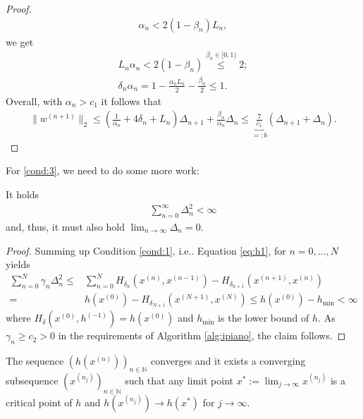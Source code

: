 \documentclass[onecolumn,final,a4paper,13pt,reqno]{siamart}
\makeatletter
\DeclareRobustCommand\onedot{\futurelet\@let@token\@onedot}
\def\@onedot{\ifx\@let@token.\else.\null\fi\xspace}
\def\ie{{i.e}\onedot} \def\Ie{{I.e}\onedot}
\makeatother
\begin{document}
\begin{proof}
	\begin{align}
		\alpha_n < {2(1 - \beta_n)}{L_n},
	\end{align}
	we get
	\begin{align}
		L_n\alpha_n < 2(1 - \beta_n) \overset{\beta_n \in [0,1)}{\leq} 2;\\
		\delta_n \alpha_n = 1 - \frac{\alpha_n L_n}{2} - \frac{\beta_n}{2} \leq 1.
	\end{align}
	Overall, with $\alpha_n > c_1$ it follows that
	\begin{align}
		\|w^{(n + 1)}\|_2 \leq \left(\frac{1}{\alpha_n} + 4\delta_n + L_n\right)\Delta_{n + 1} + \frac{\beta_n}{\alpha_n}\Delta_n \leq \underbrace{\frac{7}{c_1}}_{=: b} (\Delta_{n + 1} + \Delta_n).
	\end{align}
\end{proof}

For \ref{cond:3}, we need to do some more work:

\begin{lemmamd}
	It holds
	\begin{align}
		\sum_{n = 0}^\infty \Delta_n^2 < \infty
	\end{align}
	and, thus, it must also hold $\lim_{n \rightarrow \infty} \Delta_n = 0$.\label{lemma:delta}
\end{lemmamd}

\begin{proof}
	Summing up Condition \ref{cond:1}, \ie Equation \eqref{eq:h1}, for $n = 0,\ldots,N$ yields
	\begin{align}
		\sum_{n = 0}^N \gamma_n \Delta_n^2 \leq& \sum_{n = 0}^N H_{\delta_n}(x^{(n)}, x^{(n - 1)}) - H_{\delta_{n + 1}}(x^{(n + 1)}, x^{(n)})\\
		=& h(x^{(0)}) - H_{\delta_{N + 1}}(x^{(N + 1)}, x^{(N)}) \leq h(x^{(0)}) - h_{\min} < \infty
	\end{align}
	where $H_\delta(x^{(0)}, h^{(-1)}) = h(x^{(0)})$ and $h_{\min}$ is the lower bound of $h$. As $\gamma_n \geq c_2 > 0$ in the requirements of Algorithm \ref{alg:ipiano}, the claim follows.
\end{proof}

\begin{lemmamd}
	The sequence $(h(x^{(n)}))_{n \in \mathbb{N}}$ converges and it exists a converging subsequence $(x^{(n_j)})_{n \in \mathbb{N}}$ such that any limit point $x^\ast := \lim_{j \rightarrow \infty} x^{(n_j)}$ is a critical point of $h$ and $h(x^{(n_j)}) \rightarrow h(x^\ast)$ for $j \rightarrow \infty$.\label{lemma:convergence}
\end{lemmamd}
\end{document}
